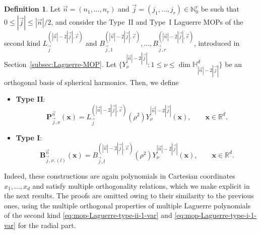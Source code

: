 \documentclass[a4paper]{article}
\theoremstyle{plain}
\theoremstyle{definition}
\newtheorem{definition}[theorem]{Definition}
\newcommand{\NN}{\mathbb{N}}
\newcommand{\RR}{\mathbb{R}}
\begin{document}
    \begin{definition}
        Let $\vec n = (n_1,\dots,n_r)$ and $\vec j = (j_1,\dots,j_r)\in\NN_0^r$ be such that  $0\leq |\vec j| \leq |\vec n|/2$, and consider the Type~II and Type~I Laguerre MOPs of the second kind $L^{(|\vec n|-2|\vec j|,\vec c)}_{\vec j}$ and $B^{(|\vec n|-2|\vec j|,\vec c)}_{\vec j,1},\dots,B^{(|\vec n|-2|\vec j|,\vec c)}_{\vec j,r}$, introduced in Section~\ref{subsec:Laguerre-MOP}. Let $\{Y_\nu^{|\vec n|-2|\vec j|}:1\leq\nu\leq\dim\mathbb H_{|\vec n|-2|\vec j|}^d\}$ be an orthogonal basis of spherical harmonics. Then, we define
        \begin{itemize}
            \item \textbf{Type II}:
            \begin{equation}\label{eq:type-ii-Laguerre-d-vars}
                \mathbf P^{\vec n}_{\vec j,\nu}(\mathbf x) = L^{(|\vec n|-2|\vec j|,\vec c)}_{\vec j}(\rho^2) Y_\nu^{|\vec n|-2|\vec j|}(\mathbf x),\qquad \mathbf x\in\RR^d.
            \end{equation}
            \item \textbf{Type I}:
            \begin{equation}\label{eq:type-i-Laguerre-d-vars}
                \mathbf B^{\vec n}_{\vec j,\nu,(l)}(\mathbf x) = B^{(|\vec n|-2|\vec j|,\vec c)}_{\vec j,l}(\rho^2) Y_\nu^{|\vec n|-2|\vec j|}(\mathbf x),\qquad \mathbf x\in\RR^d.
            \end{equation}
        \end{itemize}
    \end{definition}

    Indeed, these constructions are again polynomials in Cartesian coordinates $x_1,\dots,x_d$ and satisfy multiple orthogonality relations, which we make explicit in the next results. The proofs are omitted owing to their similarity to the previous ones, using the multiple orthogonal properties of multiple Laguerre polynomials of the second kind \eqref{eq:mop-Laguerre-type-ii-1-var} and \eqref{eq:mop-Laguerre-type-i-1-var} for the radial part.
\end{document}
